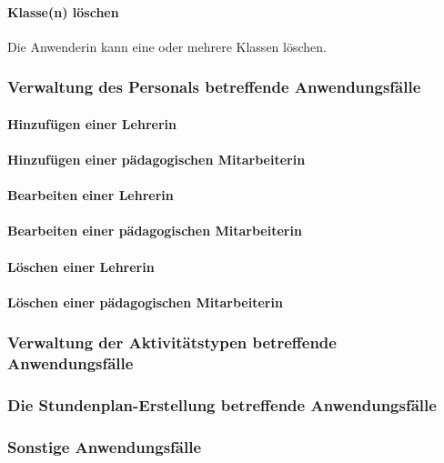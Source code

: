 \documentclass[fontsize=12pt,paper=a4,twoside]{scrartcl}
\begin{document}
\paragraph{Klasse(n) löschen} Die Anwenderin kann eine oder mehrere Klassen löschen.

\subsubsection{Verwaltung des Personals betreffende Anwendungsfälle}

\paragraph{Hinzufügen einer Lehrerin}

\paragraph{Hinzufügen einer pädagogischen Mitarbeiterin}

\paragraph{Bearbeiten einer Lehrerin}

\paragraph{Bearbeiten einer pädagogischen Mitarbeiterin}

\paragraph{Löschen einer Lehrerin}

\paragraph{Löschen einer pädagogischen Mitarbeiterin}

\subsubsection{Verwaltung der Aktivitätstypen betreffende Anwendungsfälle}

\subsubsection{Die Stundenplan-Erstellung betreffende Anwendungsfälle}

\subsubsection{Sonstige Anwendungsfälle}
\end{document}
